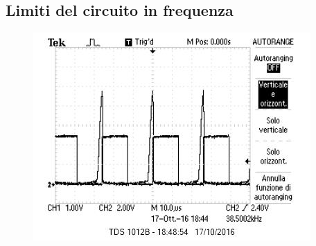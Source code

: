 \documentclass[10pt,a4paper]{article}
\begin{document}
\subsection{Limiti del circuito in frequenza}

\begin{figure}[h!]
\centering
\includegraphics{../oscilloscopio/raise_problem.jpg}
\caption{}
\end{figure}
\end{document}
